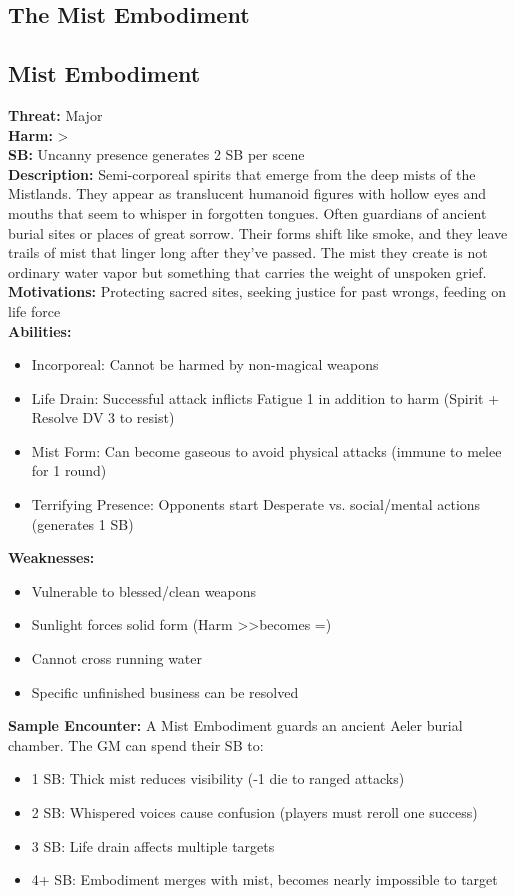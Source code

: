 \documentclass[11pt]{article}
\newenvironment{monsterentry}[1]{%
  \begin{mdframed}[backgroundcolor=shadecolor, linewidth=0pt, leftmargin=0pt, rightmargin=0pt]%
  \subsection*{#1}%
}{%
  \end{mdframed}%
}
\begin{document}
\subsection{The Mist Embodiment}

\begin{monsterentry}{Mist Embodiment}
\textbf{Threat:} Major \\
\textbf{Harm:} \textgreater \\
\textbf{SB:} Uncanny presence generates 2 SB per scene \\
\textbf{Description:} Semi-corporeal spirits that emerge from the deep mists of the Mistlands. They appear as translucent humanoid figures with hollow eyes and mouths that seem to whisper in forgotten tongues. Often guardians of ancient burial sites or places of great sorrow. Their forms shift like smoke, and they leave trails of mist that linger long after they've passed. The mist they create is not ordinary water vapor but something that carries the weight of unspoken grief. \\
\textbf{Motivations:} Protecting sacred sites, seeking justice for past wrongs, feeding on life force \\
\textbf{Abilities:}
\begin{itemize}
    \item Incorporeal: Cannot be harmed by non-magical weapons
    \item Life Drain: Successful attack inflicts Fatigue 1 in addition to harm (Spirit + Resolve DV 3 to resist)
    \item Mist Form: Can become gaseous to avoid physical attacks (immune to melee for 1 round)
    \item Terrifying Presence: Opponents start Desperate vs. social/mental actions (generates 1 SB)
\end{itemize}
\textbf{Weaknesses:}
\begin{itemize}
    \item Vulnerable to blessed/clean weapons
    \item Sunlight forces solid form (Harm \textgreater\textgreater becomes =)
    \item Cannot cross running water
    \item Specific unfinished business can be resolved
\end{itemize}
\textbf{Sample Encounter:} A Mist Embodiment guards an ancient Aeler burial chamber. The GM can spend their SB to:
\begin{itemize}
    \item 1 SB: Thick mist reduces visibility (-1 die to ranged attacks)
    \item 2 SB: Whispered voices cause confusion (players must reroll one success)
    \item 3 SB: Life drain affects multiple targets
    \item 4+ SB: Embodiment merges with mist, becomes nearly impossible to target
\end{itemize}
\end{monsterentry}
\end{document}
